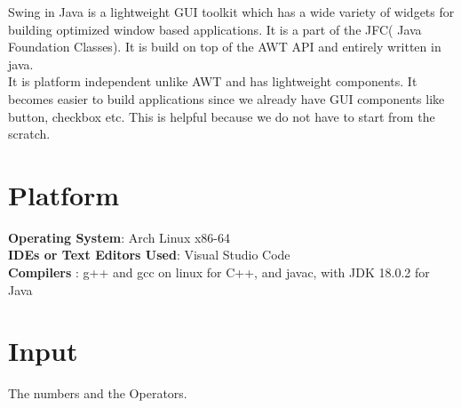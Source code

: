\documentclass[11pt]{article}
\begin{document}
Swing in Java is a lightweight GUI toolkit which has a wide variety of widgets for building optimized window based applications. It is a part of the JFC( Java Foundation Classes). It is build on top of the AWT API and entirely written in java.\\

It is platform independent unlike AWT and has lightweight components. It becomes easier to build applications since we already have GUI components like button, checkbox etc. This is helpful because we do not have to start from the scratch.

\section{Platform}
\textbf{Operating System}: Arch Linux x86-64 \\
\textbf{IDEs or Text Editors Used}: Visual Studio Code\\
\textbf{Compilers} : g++ and gcc on linux for C++, and javac, with JDK 18.0.2 for Java\\

\section{Input}
The numbers and the Operators.
\end{document}
